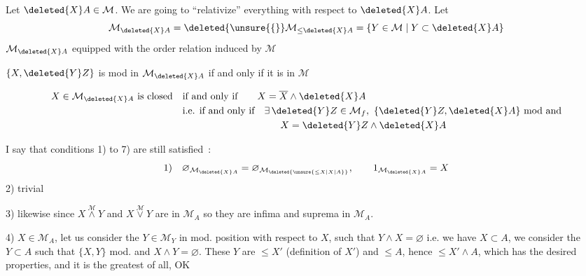 Let $\deleted{X}A\in \mathcal M$. We are going to ``relativize'' everything with respect to $\deleted{X}A$. Let 
\[
\mathcal M_{\deleted{X}A}=\deleted{\unsure{\{}}\mathcal M_{\leq\deleted{X}A}=\{Y\in \mathcal M\mid Y\subset\deleted{X}A\}
\]
$\mathcal M_{\deleted{X}A}$ equipped with the order relation induced by $\mathcal M$

$\{X,\deleted{Y}Z\}$ is mod in $\mathcal M_{\deleted{X}A}$ if and only if it is in $\mathcal M$

\[
\begin{aligned}
X\in \mathcal M_{\deleted{X}A}\text{ is closed}\quad &\text{if and only if}\qquad X=\overline X\wedge\deleted{X}A\\
&\text{i.e. if and only if}\quad\exists\,\deleted{Y}Z\in \mathcal M_f,\ \{\deleted{Y}Z,\deleted{X}A\}\ \text{mod and}\\
&\hspace{10em}X=\deleted{Y}Z\wedge\deleted{X}A
\end{aligned}
\]

I say that conditions 1) to 7) are still satisfied~:
\[
\text{1)}\quad\varnothing_{\mathcal M_{\deleted{X}A}}=\varnothing_{\mathcal M_{\deleted{\unsure{\leq X|X|A}}}},\qquad 1_{\mathcal M_{\deleted{X}A}}=X
\]
2)  trivial

3) likewise since  $X\overset{\mathcal M}{\wedge}Y$ and $X\overset{\mathcal M}{\vee}Y$ are in $\mathcal M_A$ so they are infima and suprema in $\mathcal M_A$.

4)  $X\in \mathcal M_A$, let us consider the $Y\in \mathcal M_{Y}$ in mod. position with respect to $X$, such that $Y\wedge X=\varnothing$ i.e.  we have $X\subset A$, we consider the $Y\subset A$ such that $\{X,Y\}$ mod. and $X\wedge Y=\varnothing$. These $Y$ are $\leq X'$ (definition of $X'$) and $\leq A$, hence $\leq X'\wedge A$, which has the desired properties, and it is the greatest of all, OK
